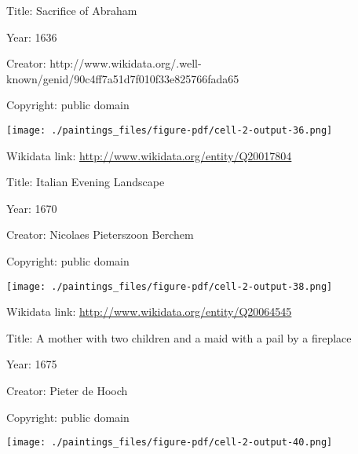 \documentclass[
  letterpaper,
]{book}
\begin{document}
Title: Sacrifice of Abraham

Year: 1636

Creator:
http://www.wikidata.org/.well-known/genid/90c4ff7a51d7f010f33e825766fada65

Copyright: public domain

\texttt{[image: ./paintings\_files/figure-pdf/cell-2-output-36.png]}

Wikidata link: \url{http://www.wikidata.org/entity/Q20017804}

Title: Italian Evening Landscape

Year: 1670

Creator: Nicolaes Pieterszoon Berchem

Copyright: public domain

\texttt{[image: ./paintings\_files/figure-pdf/cell-2-output-38.png]}

Wikidata link: \url{http://www.wikidata.org/entity/Q20064545}

Title: A mother with two children and a maid with a pail by a fireplace

Year: 1675

Creator: Pieter de Hooch

Copyright: public domain

\texttt{[image: ./paintings\_files/figure-pdf/cell-2-output-40.png]}


\backmatter
\end{document}
